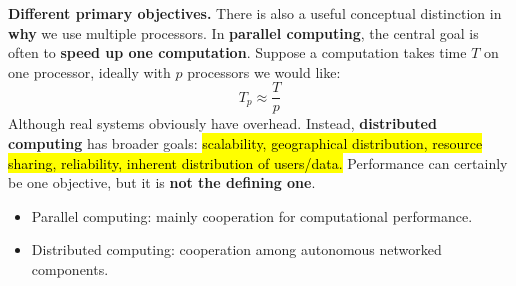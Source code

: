 \highspace
\textcolor{Green3}{ \textbf{Different primary objectives.}} There is also a useful conceptual distinction in \textbf{why} we use multiple processors. In \textbf{parallel computing}, the central goal is often to \textbf{speed up one computation}. Suppose a computation takes time $T$ on one processor, ideally with $p$ processors we would like:
\begin{equation*}
    T_{p} \approx \frac{T}{p}
\end{equation*}
Although real systems obviously have overhead. Instead, \textbf{distributed computing} has broader goals: \hl{scalability, geographical distribution, resource sharing, reliability, inherent distribution of users/data.} Performance can certainly be one objective, but it is \textbf{not the defining one}.
\begin{itemize}
    \item Parallel computing: mainly cooperation for computational performance.
    \item Distributed computing: cooperation among autonomous networked components.
\end{itemize}

